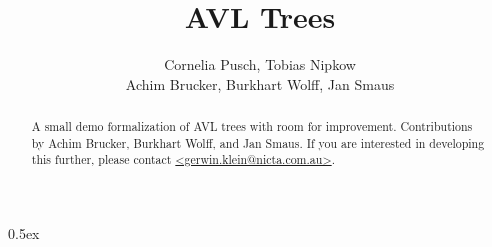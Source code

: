 \documentclass[11pt,a4paper]{article}
\begin{document}
\title{AVL Trees}
\author{Cornelia Pusch, Tobias Nipkow\\ Achim Brucker, Burkhart Wolff, Jan Smaus}
\maketitle

\begin{abstract}
  A small demo formalization of AVL trees with room for improvement.  
  Contributions by Achim Brucker, Burkhart Wolff, and Jan Smaus.
  If you are interested in developing this further, please contact 
  \url{<gerwin.klein@nicta.com.au>}.
\end{abstract}

\tableofcontents

\parindent 0pt\parskip 0.5ex


\end{document}
